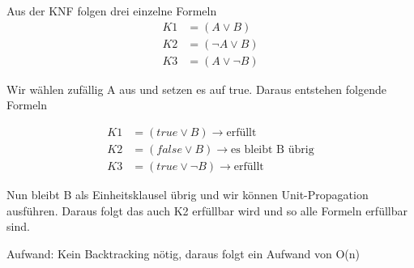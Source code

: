 \documentclass[a4paper,12pt]{article}
\begin{document}
Aus der KNF folgen drei einzelne Formeln 
\begin{align}
    K1 &= (A \lor B) \\
    K2 &= (\neg A \lor B) \\
    K3 &= (A \lor \neg B)
\end{align}

Wir wählen zufällig A aus und setzen es auf true. Daraus entstehen folgende Formeln

\begin{align}
    K1 &= (true \lor B) \rightarrow \text{erfüllt}\\
    K2 &= (false \lor B) \rightarrow \text{es bleibt B übrig}\\
    K3 &= (true \lor \neg B) \rightarrow \text{erfüllt}
\end{align}

Nun bleibt B als Einheitsklausel übrig und wir können Unit-Propagation ausführen.
Daraus folgt das auch K2 erfüllbar wird und so alle Formeln erfüllbar sind.

Aufwand: Kein Backtracking nötig, daraus folgt ein Aufwand von O(n)
\end{document}
